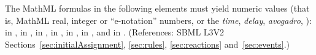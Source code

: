 The MathML formulas in the following elements must yield numeric
values (that is, MathML real, integer or ``e-notation'' numbers,
or the \emph{time}, \emph{delay}, \emph{avogadro},  ):
 in \KineticLaw,  in
\InitialAssignment,  in \AssignmentRule,  in
\RateRule,  in \AlgebraicRule,  in \Event
\Delay, and  in \EventAssignment.  (References: SBML L3V2 
Sections~\ref{sec:initialAssignment}, \ref{sec:rules}, 
\ref{sec:reactions} and~\ref{sec:events}.)


